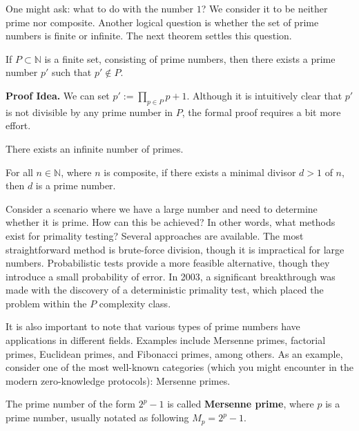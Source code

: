 \documentclass[../lecture-notes-148x210.tex]{subfiles}
\begin{document}
One might ask: what to do with the number $1$? We consider it to be neither prime 
nor composite. Another logical question is whether the set of prime numbers is finite or infinite.
The next theorem settles this question.

\begin{theorem} 
    If $P \subset \mathbb{N}$ is a finite set, consisting of prime numbers, then
    there exists a prime number $p'$ such that $p' \notin P$.
\end{theorem}

\textbf{Proof Idea.} We can set $p' := \prod_{p \in P}p + 1$. Although it is 
intuitively clear that $p'$ is not divisible by any prime number in $P$, the
formal proof requires a bit more effort.

\begin{corollary}
    There exists an infinite number of primes.
\end{corollary}

\begin{lemma}
    For all $n \in \mathbb{N}$, where $n$ is composite, if there exists a 
    minimal divisor $d>1$ of $n$, then $d$ is a prime number.
\end{lemma}

Consider a scenario where we have a large number and need to determine whether
it is prime. How can this be achieved? In other words, what methods exist for
primality testing? Several approaches are available. The most straightforward
method is brute-force division, though it is impractical for large numbers.
Probabilistic tests provide a more feasible alternative, though they introduce a
small probability of error. In 2003, a significant breakthrough was made with
the discovery of a deterministic primality test, which placed the problem within
the $P$ complexity class.

It is also important to note that various types of prime numbers have
applications in different fields. Examples include Mersenne primes, factorial
primes, Euclidean primes, and Fibonacci primes, among others. As an example,
consider one of the most well-known categories (which you might encounter in the
modern zero-knowledge protocols): Mersenne primes.

\begin{definition}
    The prime number of the form $2^p - 1$ is called \textbf{Mersenne prime}, where $p$ is a
    prime number, usually notated as following $M_p = 2^p - 1$.
\end{definition}
\end{document}
